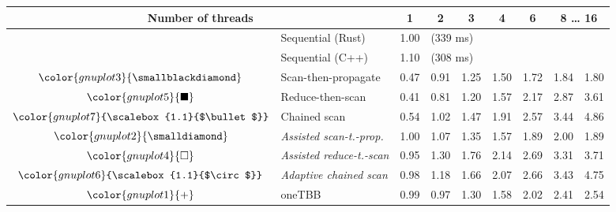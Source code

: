 \begin{tabular}{clrrrrrrr}
\toprule
\multicolumn{2}{c}{\textbf{Number of threads}} & \multicolumn{1}{c}{\textbf{ 1 }} & \multicolumn{1}{c}{\textbf{ 2 }} & \multicolumn{1}{c}{\textbf{ 3 }} & \multicolumn{1}{c}{\textbf{ 4 }} & \multicolumn{1}{c}{\textbf{ 6 }} & \multicolumn{2}{c}{\textbf{ 8 } \dots \textbf{ 16 }} \\
\midrule
& Sequential (Rust) & \multicolumn{1}{r}{ 1.00 } & \multicolumn{ 6 }{l}{(339 ms)} \\
& Sequential (C++) & \multicolumn{1}{r}{ 1.10 } & \multicolumn{ 6 }{l}{(308 ms)} \\
\rowcolor{gnuplot3!10}$\color{gnuplot3}{\smallblackdiamond}$ & Scan-then-propagate & \cellcolor{gnuplot3!10} 0.47 & \cellcolor{gnuplot3!10} 0.91 & \cellcolor{gnuplot3!10} 1.25 & \cellcolor{gnuplot3!10} 1.50 & \cellcolor{gnuplot3!10} 1.72 & \cellcolor{gnuplot3!10} 1.84 & \cellcolor{gnuplot3!10} 1.80 \\
\rowcolor{gnuplot5!10}$\color{gnuplot5}{\blacksquare}$ & Reduce-then-scan & \cellcolor{gnuplot5!10} 0.41 & \cellcolor{gnuplot5!10} 0.81 & \cellcolor{gnuplot5!10} 1.20 & \cellcolor{gnuplot5!10} 1.57 & \cellcolor{gnuplot5!10} 2.17 & \cellcolor{gnuplot5!10} 2.87 & \cellcolor{gnuplot5!10} 3.61 \\
\rowcolor{gnuplot7!10}$\color{gnuplot7}{\scalebox{1.1}{$\bullet$}}$ & Chained scan & \cellcolor{gnuplot7!10} 0.54 & \cellcolor{gnuplot7!10} 1.02 & \cellcolor{gnuplot7!10} 1.47 & \cellcolor{gnuplot7!10} 1.91 & \cellcolor{gnuplot7!10} 2.57 & \cellcolor{gnuplot7!10} 3.44 & \cellcolor{gnuplot7!10} 4.86 \\
\rowcolor{gnuplot2!30}$\color{gnuplot2}{\smalldiamond}$ & \textit{Assisted scan-t.-prop.} & \cellcolor{gnuplot2!30} 1.00 & \cellcolor{gnuplot2!30} 1.07 & \cellcolor{gnuplot2!30} 1.35 & \cellcolor{gnuplot2!30} 1.57 & \cellcolor{gnuplot2!30} 1.89 & \cellcolor{gnuplot2!30} 2.00 & \cellcolor{gnuplot2!30} 1.89 \\
\rowcolor{gnuplot4!30}$\color{gnuplot4}{\square}$ & \textit{Assisted reduce-t.-scan} & \cellcolor{gnuplot4!30} 0.95 & \cellcolor{gnuplot4!30} 1.30 & \cellcolor{gnuplot4!30} 1.76 & \cellcolor{gnuplot4!30} 2.14 & \cellcolor{gnuplot4!30} 2.69 & \cellcolor{gnuplot4!30} 3.31 & \cellcolor{gnuplot4!30} 3.71 \\
\rowcolor{gnuplot6!30}$\color{gnuplot6}{\scalebox{1.1}{$\circ$}}$ & \textit{Adaptive chained scan} & \cellcolor{gnuplot6!30} 0.98 & \cellcolor{gnuplot6!30} 1.18 & \cellcolor{gnuplot6!30} 1.66 & \cellcolor{gnuplot6!30} 2.07 & \cellcolor{gnuplot6!30} 2.66 & \cellcolor{gnuplot6!30} 3.43 & \cellcolor{gnuplot6!30} 4.75 \\
\rowcolor{gnuplot1!10}$\color{gnuplot1}{+}$ & oneTBB & \cellcolor{gnuplot1!10} 0.99 & \cellcolor{gnuplot1!10} 0.97 & \cellcolor{gnuplot1!10} 1.30 & \cellcolor{gnuplot1!10} 1.58 & \cellcolor{gnuplot1!10} 2.02 & \cellcolor{gnuplot1!10} 2.41 & \cellcolor{gnuplot1!10} 2.54 \\
\bottomrule
\end{tabular}
